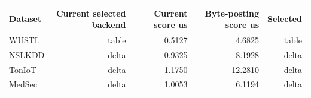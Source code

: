 \begin{tabular}{lrrrr}
\toprule
Dataset & Current selected backend & Current score us & Byte-posting score us & Selected \\
\midrule
WUSTL & table & 0.5127 & 4.6825 & table \\
NSLKDD & delta & 0.9325 & 8.1928 & delta \\
TonIoT & delta & 1.1750 & 12.2810 & delta \\
MedSec & delta & 1.0053 & 6.1194 & delta \\
\bottomrule
\end{tabular}
